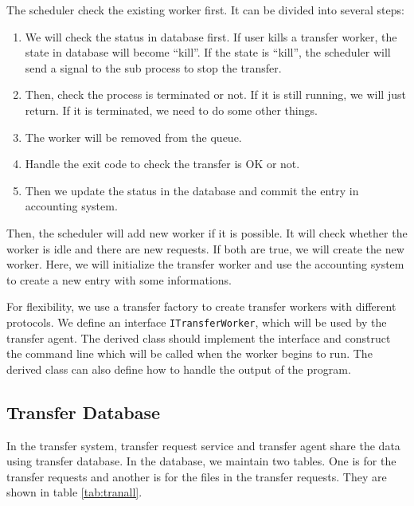 The scheduler check the existing worker first.
It can be divided into several steps:
\begin{enumerate}
    \item We will check the status in database first.
          If user kills a transfer worker, the state in
          database will become ``kill''.
          If the state is ``kill'', the scheduler will
          send a signal to the sub process to stop the
          transfer.
    \item Then, check the process is terminated or not.
          If it is still running, we will just return.
          If it is terminated, we need to do some other things.
    \item The worker will be removed from the queue.
    \item Handle the exit code to check the transfer is OK or not.
    \item Then we update the status in the database 
          and commit the entry in accounting system.
\end{enumerate}

Then, the scheduler will add new worker if it is possible.
It will check whether the worker is idle and there are new requests.
If both are true, we will create the new worker.
Here, we will initialize the transfer worker and use the accounting
system to create a new entry with some informations.

For flexibility, we use a transfer factory to create transfer workers
with different protocols. 
We define an interface {\tt ITransferWorker},
which will be used by the transfer agent. The derived class should
implement the interface and construct the command line which will 
be called when the worker begins to run.
The derived class can also define how to handle the output of the 
program.

\subsection{Transfer Database}

In the transfer system, transfer request service and transfer agent
share the data using transfer database. In the database, we maintain
two tables. One is for the transfer requests and another is for the 
files in the transfer requests. They are shown in table 
\ref{tab:tranall}.


